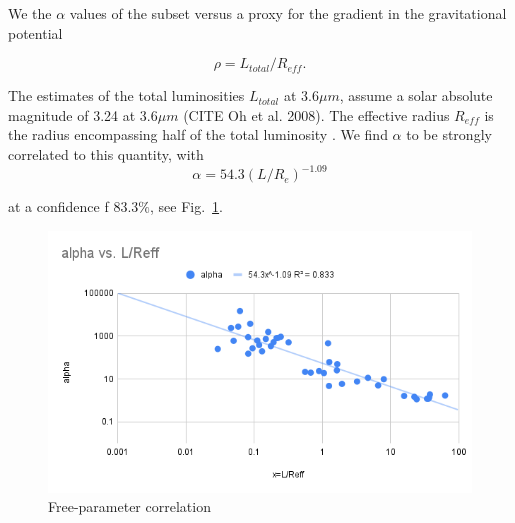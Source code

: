 \documentclass[reprint,%
 amsmath,amssymb,
 aps,
]{revtex4-1}
\begin{document}


  We the  $\alpha$ values of the subset versus a proxy for the gradient in the gravitational potential
  
   \begin{equation}
     \rho = L_{total}/R_{eff}.
 \end{equation}
 
 The  estimates of the  total luminosities $L_{total}$ at $3.6 \mu m$,  assume a solar
absolute magnitude of 3.24 at $3.6 \mu m$ (CITE Oh et al. 2008). The effective radius $R_{eff}$ is    the radius encompassing half of the total luminosity \citet{2016Lelli}.  We find $\alpha$  to be   strongly correlated to  this quantity, with 
\begin{equation}
    \alpha = 54.3 (L/R_e)^{-1.09}
\end{equation}

at a confidence f $83.3\%$, see Fig.~\ref{alpha2}.
  
 \begin{figure}[h]
\includegraphics[width=\linewidth]{alphavL_Reff.png} 
\caption{  Free-parameter correlation   }
\label{alpha2}
\end{figure}  
 
\end{document}
